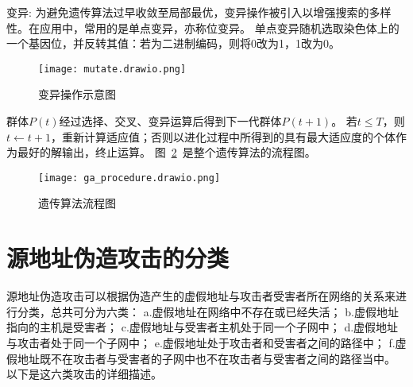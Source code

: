 变异:
为避免遗传算法过早收敛至局部最优，变异操作被引入以增强搜索的多样性。在应用中，常用的是单点变异，亦称位变异。
单点变异随机选取染色体上的一个基因位，并反转其值：若为二进制编码，则将0改为1，1改为0。
\begin{figure}[h]
  \centering
  \texttt{[image: mutate.drawio.png]}
  \caption{变异操作示意图}
  \label{fig:mutate}
\end{figure}

群体$P(t)$经过选择、交叉、变异运算后得到下一代群体$P(t+1)$。
若$t\leq T$，则 $t \leftarrow t + 1$，重新计算适应值；否则以进化过程中所得到的具有最大适应度的个体作为最好的解输出，终止运算。
图~\ref{fig:ga_procedure}~是整个遗传算法的流程图。
\begin{figure}[h]
  \centering
  \texttt{[image: ga\_procedure.drawio.png]}
  \caption{遗传算法流程图}
  \label{fig:ga_procedure}
\end{figure}

\section{源地址伪造攻击的分类}

源地址伪造攻击可以根据伪造产生的虚假地址与攻击者受害者所在网络的关系来进行分类，总共可分为六类：
a.虚假地址在网络中不存在或已经失活；
b.虚假地址指向的主机是受害者；
c.虚假地址与受害者主机处于同一个子网中；
d.虚假地址与攻击者处于同一个子网中；
e.虚假地址处于攻击者和受害者之间的路径中；
f.虚假地址既不在攻击者与受害者的子网中也不在攻击者与受害者之间的路径当中\cite{lee2021classification}。
以下是这六类攻击的详细描述。

